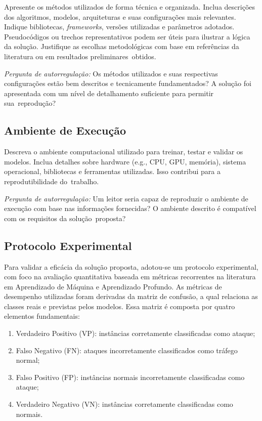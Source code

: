 \documentclass[conference]{IEEEtran}
\begin{document}
Apresente os métodos utilizados de forma técnica e organizada. Inclua descrições dos algoritmos, modelos, arquiteturas e suas configurações mais relevantes.
Indique bibliotecas, \textit{frameworks}, versões utilizadas e parâmetros adotados. Pseudocódigos ou trechos representativos podem ser úteis para ilustrar a lógica da solução. Justifique as escolhas metodológicas com base em referências da literatura ou em resultados preliminares~obtidos.

\textit{Pergunta de autorregulação:} 
Os métodos utilizados e suas respectivas configurações estão bem descritos e tecnicamente fundamentados? A solução foi apresentada com um nível de detalhamento suficiente para permitir sua~reprodução?

\subsection{Ambiente de Execução}

Descreva o ambiente computacional utilizado para treinar, testar e validar os modelos. Inclua detalhes sobre hardware (e.g., CPU, GPU, memória), sistema operacional, bibliotecas e ferramentas utilizadas.
Isso contribui para a reprodutibilidade do~trabalho.

\textit{Pergunta de autorregulação:} 
Um leitor seria capaz de reproduzir o ambiente de execução com base nas informações fornecidas?
O ambiente descrito é compatível com os requisitos da solução~proposta?

\subsection{Protocolo Experimental}

    Para validar a eficácia da solução proposta, adotou-se um protocolo experimental, com foco na avaliação quantitativa baseada em métricas recorrentes na literatura em Aprendizado de Máquina e Aprendizado Profundo. As métricas de desempenho utilizadas foram derivadas da matriz de confusão, a qual relaciona as classes reais e previstas pelos modelos. Essa matriz é composta por quatro elementos fundamentais:
    
    \hspace{1cm}
    \begin{enumerate}[I]
    \item Verdadeiro Positivo (VP): instâncias corretamente classificadas como ataque;
    \item Falso Negativo (FN): ataques incorretamente classificados como tráfego normal;
    \item Falso Positivo (FP): instâncias normais incorretamente classificadas como ataque;
    \item Verdadeiro Negativo (VN): instâncias corretamente classificadas como normais.
    \end{enumerate}
    \hspace{1cm}
\end{document}
